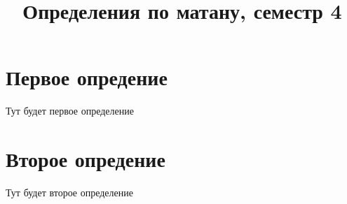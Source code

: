\documentclass[paper=a4, fontsize=11pt]{article}
\title{Определения по матану, семестр 4}
\begin{document}
\maketitle
\tableofcontents
\newpage

\section{Первое опредение}
Тут будет первое определение

\section{Второе опредение}
Тут будет второе определение
\end{document}
